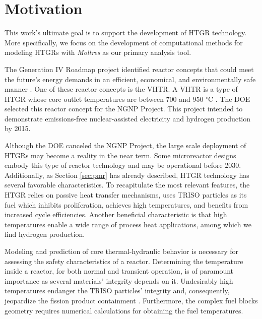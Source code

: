 
\section{Motivation}

This work's ultimate goal is to support the development of \gls{HTGR} technology.
More specifically, we focus on the development of computational methods for modeling \glspl{HTGR} with \textit{Moltres} \cite{lindsay_introduction_2018} as our primary analysis tool.

The Generation IV Roadmap project identified reactor concepts that could meet the future's energy demands in an efficient, economical, and environmentally safe manner \cite{macdonald_ngnp_2003}.
One of these reactor concepts is the \gls{VHTR}.
A \gls{VHTR} is a type of HTGR whose core outlet temperatures are between 700 and 950 $^{\circ}$C \cite{gif_gif_2019}.
The \gls{DOE} selected this reactor concept for the \gls{NGNP} Project.
This project intended to demonstrate emissions-free nuclear-assisted electricity and hydrogen production by 2015.

Although the \gls{DOE} canceled the \gls{NGNP} Project, the large scale deployment of HTGRs may become a reality in the near term.
Some microreactor designs embody this type of reactor technology and may be operational before 2030.
Additionally, as Section \ref{sec:pmr} has already described, HTGR technology has several favorable characteristics.
To recapitulate the most relevant features, the \gls{HTGR} relies on passive heat transfer mechanisms, uses TRISO particles as its fuel which inhibits proliferation, achieves high temperatures, and benefits from increased cycle efficiencies.
Another beneficial characteristic is that high temperatures enable a wide range of process heat applications, among which we find hydrogen production.

Modeling and prediction of core thermal-hydraulic behavior is necessary for assessing the safety characteristics of a reactor.
Determining the temperature inside a reactor, for both normal and transient operation, is of paramount importance as several materials' integrity depends on it.
Undesirably high temperatures endanger the TRISO particles' integrity and, consequently, jeopardize the fission product containment \cite{tak_numerical_2008}.
Furthermore, the complex fuel blocks geometry requires numerical calculations for obtaining the fuel temperatures.

